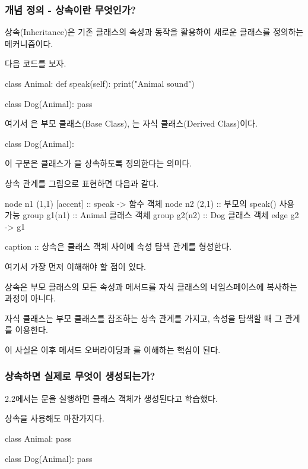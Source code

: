 \subsubsection{개념 정의 - 상속이란 무엇인가?}

상속(Inheritance)은 기존 클래스의 속성과 동작을 활용하여 새로운 클래스를 정의하는 메커니즘이다.

다음 코드를 보자.

\begin{dhkcode}
class Animal:
    def speak(self):
        print("Animal sound")


class Dog(Animal):
    pass
\end{dhkcode}

여기서 은 부모 클래스(Base Class), 는 자식 클래스(Derived Class)이다.

\begin{dhkcode}
class Dog(Animal):
\end{dhkcode}

이 구문은  클래스가 을 상속하도록 정의한다는 의미다.

상속 관계를 그림으로 표현하면 다음과 같다.

\begin{dhkgraph}[uniform]
node n1 (1,1) [accent] :: speak -> 함수 객체
node n2 (2,1) :: 부모의 speak() 사용 가능
group g1(n1) :: Animal 클래스 객체 
group g2(n2) :: Dog 클래스 객체 
edge g2 -> g1

caption :: 상속은 클래스 객체 사이에 속성 탐색 관계를 형성한다.
\end{dhkgraph}

여기서 가장 먼저 이해해야 할 점이 있다.

상속은 부모 클래스의 모든 속성과 메서드를 자식 클래스의 네임스페이스에 복사하는 과정이 아니다.

자식 클래스는 부모 클래스를 참조하는 상속 관계를 가지고, 속성을 탐색할 때 그 관계를 이용한다.

이 사실은 이후 메서드 오버라이딩과 를 이해하는 핵심이 된다.

\subsubsection{상속하면 실제로 무엇이 생성되는가?}

2.2에서는 문을 실행하면 클래스 객체가 생성된다고 학습했다.

상속을 사용해도 마찬가지다.

\begin{dhkcode}
class Animal:
    pass

class Dog(Animal):
    pass
\end{dhkcode}

